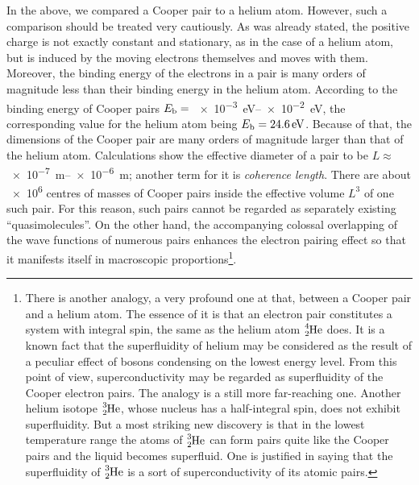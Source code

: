 In the above, we compared a Cooper pair to a helium atom. However, such a comparison should be treated very cautiously. As was already stated, the positive charge is not exactly constant and stationary, as in the case of a helium atom, but is induced by the moving electrons themselves and moves with them. Moreover, the binding energy of the electrons in a pair is many orders of magnitude less than their binding energy in the helium atom. According to  the binding energy of Cooper pairs $E_{\text{b}}=$ \SIrange{e-3}{e-2}{\electronvolt}, the corresponding value for the helium atom being  $E_{\text{b}}=\SI{24.6}{\electronvolt}$. Because
of that, the dimensions of the Cooper pair are many orders of magnitude larger than that of the helium atom. Calculations show the effective diameter of a pair to be $L\approx$ \SIrange{e-7}{e-6}{\metre}; another term for it is \textit{coherence length}. There are about \num{e6} centres of masses of Cooper pairs inside the effective volume $L^3$ of one such pair. For this reason, such pairs cannot be regarded as separately existing ``quasimolecules''. On the other hand, the accompanying colossal overlapping of the wave functions of numerous pairs enhances the electron pairing effect so that it manifests itself in macroscopic proportions\footnote{There is another analogy, a very profound one at that, between a Cooper pair and a helium atom. The essence of it is that an electron pair constitutes a system with integral spin, the same as the helium atom $\ce{^4_2He}$ does. It is a known fact that the superfluidity of helium may be considered as the result of a peculiar effect of bosons condensing on the lowest energy level. From this point of view,
superconductivity may be regarded as superfluidity of the Cooper electron pairs. The analogy is a still more far-reaching one. Another helium isotope $\ce{^3_2He}$, whose nucleus has a half-integral spin, does not exhibit superfluidity. But a most striking new discovery is that in the lowest temperature range the atoms of $\ce{^3_2He}$ can form pairs quite like the Cooper pairs and the liquid becomes superfluid. One is justified in saying that the superfluidity of $\ce{^3_2He}$ is a sort of superconductivity of its atomic pairs.}.

